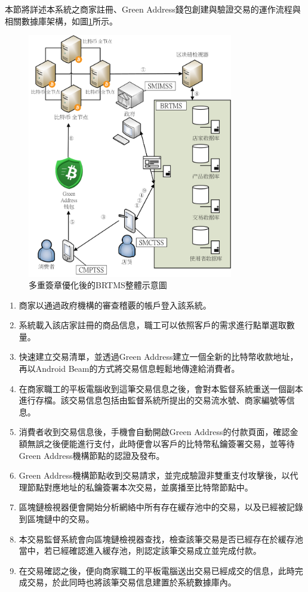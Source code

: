 本節將詳述本系統之商家註冊、Green Address錢包創建與驗證交易的運作流程與相關數據庫架構，如圖\ref{gabpcss}所示。

	\begin{figure}[htbp]
		\centering
		\includegraphics[width = 0.8\textwidth]{gabpcss.png}
		\caption{多重簽章優化後的BRTMS整體示意圖}\label{gabpcss}
	\end{figure}

	\begin{enumerate}
		\item 商家以通過政府機構的審查稽覈的帳戶登入該系統。
		\item 系統載入該店家註冊的商品信息，職工可以依照客戶的需求進行點單選取數量。
		\item 快速建立交易清單，並透過Green Address建立一個全新的比特幣收款地址，再以Android Beam的方式將交易信息輕鬆地傳達給消費者。
		\item 在商家職工的平板電腦收到這筆交易信息之後，會對本監督系統重送一個副本進行存檔。該交易信息包括由監督系統所提出的交易流水號、商家編號等信息。
		\item 消費者收到交易信息後，手機會自動開啟Green Address的付款頁面，確認金額無誤之後便能進行支付，此時便會以客戶的比特幣私鑰簽署交易，並等待Green Address機構節點的認證及發布。
		\item Green Address機構節點收到交易請求，並完成驗證非雙重支付攻擊後，以代理節點對應地址的私鑰簽署本次交易，並廣播至比特幣節點中。
		\item 區塊鏈檢視器便會開始分析網絡中所有存在緩存池中的交易，以及已經被記錄到區塊鏈中的交易。
		\item 本交易監督系統會向區塊鏈檢視器查找，檢查該筆交易是否已經存在於緩存池當中，若已經確認進入緩存池，則認定該筆交易成立並完成付款。
		\item 在交易確認之後，便向商家職工的平板電腦送出交易已經成交的信息，此時完成交易，於此同時也將該筆交易信息建置於系統數據庫內。
	\end{enumerate}
